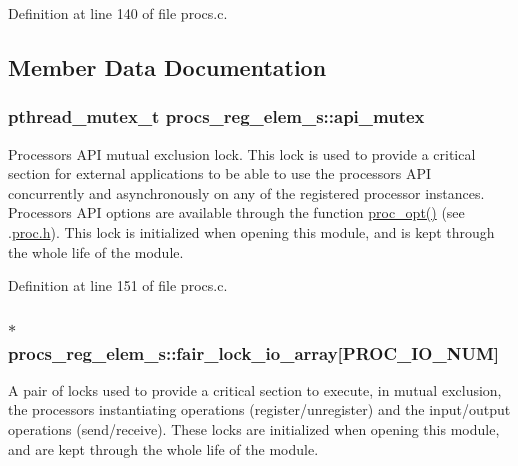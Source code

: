 Definition at line 140 of file procs.\+c.



\subsection{Member Data Documentation}
\subsubsection[{\texorpdfstring{api\+\_\+mutex}{api_mutex}}]{\setlength{\rightskip}{0pt plus 5cm}pthread\+\_\+mutex\+\_\+t procs\+\_\+reg\+\_\+elem\+\_\+s\+::api\+\_\+mutex}\hypertarget{structprocs__reg__elem__s_a9b7bb6d12868ba74184d95f1a2fdd2ab}{}\label{structprocs__reg__elem__s_a9b7bb6d12868ba74184d95f1a2fdd2ab}
Processor\textquotesingle{}s A\+PI mutual exclusion lock. This lock is used to provide a critical section for external applications to be able to use the processor\textquotesingle{}s A\+PI concurrently and asynchronously on any of the registered processor instances. Processor\textquotesingle{}s A\+PI options are available through the function \textquotesingle{}\hyperlink{proc_8c_a0367a65712bcd2e762ec1e9e3035cb3b}{proc\+\_\+opt()}\textquotesingle{} (see .\hyperlink{proc_8h}{proc.\+h}). This lock is initialized when opening this module, and is kept through the whole life of the module. 

Definition at line 151 of file procs.\+c.

\subsubsection[{\texorpdfstring{fair\+\_\+lock\+\_\+io\+\_\+array}{fair_lock_io_array}}]{$\ast$ procs\+\_\+reg\+\_\+elem\+\_\+s\+::fair\+\_\+lock\+\_\+io\+\_\+array\mbox{[}P\+R\+O\+C\+\_\+\+I\+O\+\_\+\+N\+UM\mbox{]}}\hypertarget{structprocs__reg__elem__s_a4de246450a9e79fe65ab600814311c6d}{}\label{structprocs__reg__elem__s_a4de246450a9e79fe65ab600814311c6d}
A pair of locks used to provide a critical section to execute, in mutual exclusion, the processor\textquotesingle{}s instantiating operations (register/unregister) and the input/output operations (send/receive). These locks are initialized when opening this module, and are kept through the whole life of the module. 

